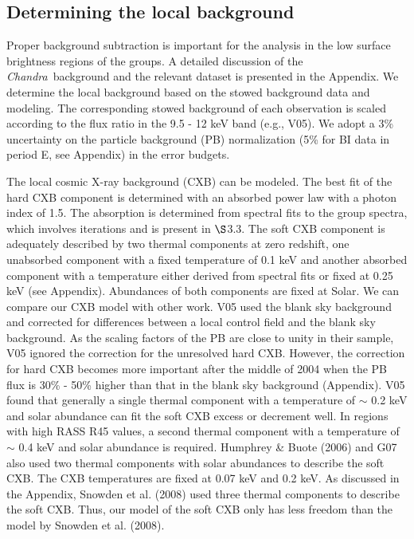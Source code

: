 \documentclass{aastex}
\def\chandra    {{\em Chandra}\/}
\begin{document}
\subsection{Determining the local background}

Proper background subtraction is important for the analysis in the low surface
brightness regions of the groups. A detailed discussion of the \chandra\ background
and the relevant dataset is presented in the Appendix.
We determine the local background based on the stowed background data
and modeling. The corresponding stowed background of each observation is
scaled according to the flux ratio in the 9.5 - 12 keV band (e.g., V05).
We adopt a 3\% uncertainty on the particle background (PB) normalization (5\% for BI
data in period E, see Appendix) in the error budgets.

The local cosmic X-ray background (CXB) can be modeled.
The best fit of the hard CXB component is determined with an absorbed power
law with a photon index of 1.5. The absorption is determined from spectral fits
to the group spectra, which involves iterations and is present in $\S$3.3.
The soft CXB component is adequately described by two thermal components
at zero redshift, one unabsorbed component with a fixed temperature of 0.1 keV and
another absorbed component with a temperature either derived from spectral fits
or fixed at 0.25 keV (see Appendix). Abundances of both components are fixed at Solar.
We can compare our CXB model with other work. V05 used the blank sky
background and corrected for differences between a local control field and
the blank sky background. As the scaling factors of the PB are
close to unity in their sample, V05 ignored the correction for the unresolved hard CXB.
However, the correction for hard CXB becomes more important after the middle of 2004 when
the PB flux is 30\% - 50\% higher than that in the blank sky
background (Appendix). V05 found that generally a single thermal component with a
temperature of $\sim$ 0.2 keV and solar abundance can fit the soft CXB excess or
decrement well. In regions with high RASS R45 values, a second thermal
component with a temperature of $\sim$ 0.4 keV and solar abundance is required.
Humphrey \& Buote (2006) and G07
also used two thermal components with solar abundances to describe the soft CXB. The
CXB temperatures are fixed at 0.07 keV and 0.2 keV. As discussed in the Appendix,
Snowden et al. (2008) used three thermal components to describe the soft CXB. Thus,
our model of the soft CXB only has less freedom than the model by Snowden et al. (2008).
\end{document}

